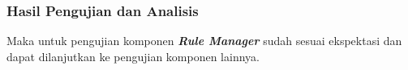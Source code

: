 \subsubsection{Hasil Pengujian dan Analisis}


Maka untuk pengujian komponen \textbf{\textit{Rule Manager}} sudah sesuai ekspektasi dan dapat dilanjutkan ke pengujian komponen lainnya.